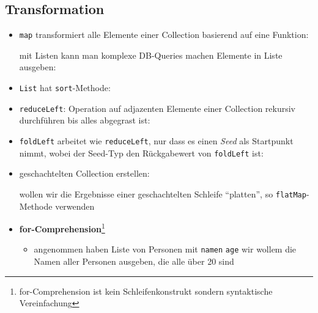 \subsection{Transformation}
\begin{itemize}
  \item \texttt{map} transformiert alle Elemente einer Collection
  basierend auf eine Funktion:
  
  
  
  
  mit Listen kann man komplexe DB-Queries machen
  \und Elemente in Liste ausgeben:
  
  
  
  \item \texttt{List} hat \texttt{sort}-Methode:
  
  
  
  \item \texttt{reduceLeft}: Operation auf adjazenten Elemente einer
  Collection rekursiv durchführen bis alles abgegrast ist:
  
  
  
  \item \texttt{foldLeft} arbeitet wie \texttt{reduceLeft}, nur dass es 
  einen \textit{Seed} als Startpunkt nimmt, wobei der Seed-Typ den Rückgabewert von \texttt{foldLeft} ist:
  
  
  
  \item geschachtelten Collection erstellen:
  
  
  
  wollen wir die Ergebnisse einer geschachtelten Schleife 
  \enquote{platten}, so \texttt{flatMap}-Methode verwenden
  
  \item \textbf{for-Comprehension}\footnote{for-Comprehension ist 
  kein Schleifenkonstrukt sondern syntaktische Vereinfachung}
  \begin{itemize}
    \item angenommen haben Liste von Personen mit \texttt{namen} \und 
    \texttt{age} \und wir wollem die Namen aller Personen ausgeben, die
    alle über 20 sind
    
    
    

\end{itemize}
\end{itemize}
